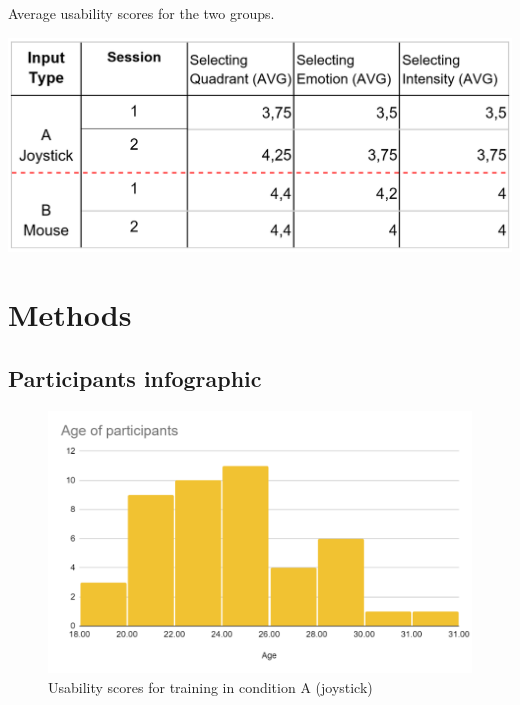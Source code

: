 \begin{table}[!htb]
  \caption{Average usability scores for the two groups.}
  \label{tbl:table_usability__scores}
  \includegraphics[width=\linewidth]{img/appendix/table_usability_scores.png}
\end{table}

\section{Methods}
\label{sec:appendix_A2}

\subsection{Participants infographic}
\label{sec:appendix_A2.1}

\begin{figure}[!htb]
\includegraphics[width=14cm]{img/appendix/age_distribution.png}
\centering
\caption{Usability scores for training in condition A (joystick)}\label{fig:usbility_condition_B}
\end{figure}

